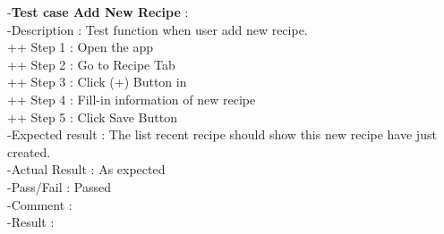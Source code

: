 \documentclass{article}
\begin{document}
        -\textbf{Test case Add New Recipe }: \\
        -Description : Test function when user add new recipe. \\
        ++ Step 1 : Open the app  \\
        ++ Step 2 : Go to Recipe Tab \\
        ++ Step 3 : Click (+) Button in  \\
        ++ Step 4 : Fill-in information of new recipe \\
        ++ Step 5 : Click Save Button \\
        -Expected result : The list recent recipe should show this new recipe have just created. \\
        -Actual Result : As expected \\
        -Pass/Fail : Passed \\
        -Comment :  \\
        -Result : 
\end{document}

